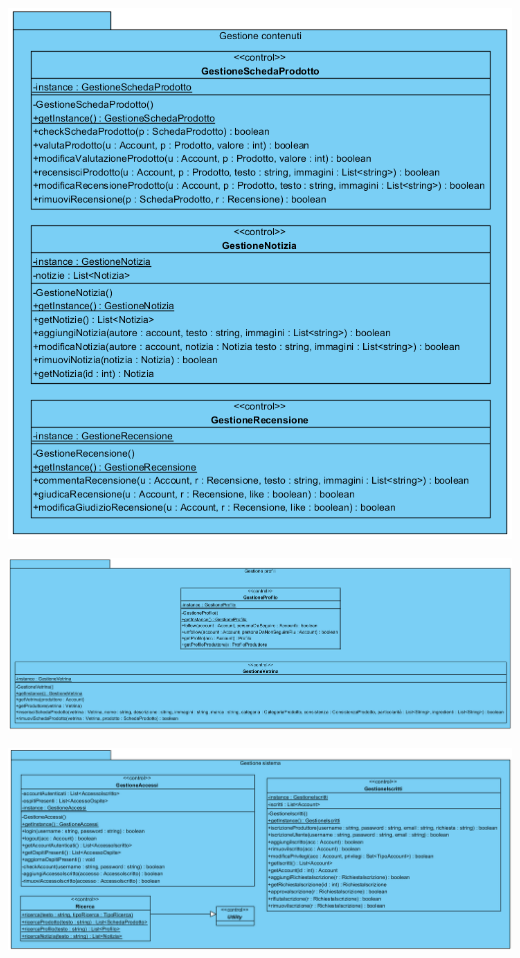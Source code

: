 \begin{center}
			\includegraphics[width=\textwidth]{assets/visualParadigm/classi/GestioneContenuti}
\end{center}

\begin{landscape}
\begin{center}
			\includegraphics[width=\linewidth]{assets/visualParadigm/classi/GestioneProfili}
\end{center}
\end{landscape}

\begin{landscape}
\begin{center}
			\includegraphics[width=\linewidth]{assets/visualParadigm/classi/GestioneSistema}
\end{center}
\end{landscape}

